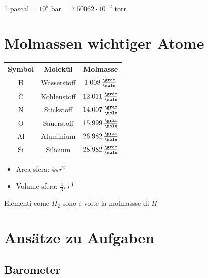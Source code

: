 1 pascal = $10^5$ bar = $7.50062 \cdot 10^{-2}$ torr

\section{Molmassen wichtiger Atome}
\begin{minipage}{0.5\columnwidth}
    \renewcommand{\arraystretch}{1.3}
    \begin{tabular}{c | c | c }
        \textbf{Symbol} & \textbf{Molekül}  & \textbf{Molmasse}                 \\
        \hline
        H               & Wasserstoff       & $1.008 \, \frac{\gram}{\mole}$    \\
        C               & Kohlenstoff       & $12.011 \, \frac{\gram}{\mole}$   \\
        N               & Stickstoff        & $14.007 \, \frac{\gram}{\mole}$   \\
        O               & Sauerstoff        & $15.999 \, \frac{\gram}{\mole}$   \\
        Al              & Aluminium         & $26.982 \, \frac{\gram}{\mole}$   \\
        Si              & Silicium          & $28.982 \, \frac{\gram}{\mole}$   \\
    \end{tabular}\smallbreak
\end{minipage}\hfill
\begin{minipage}[b]{0.49\columnwidth}
    \begin{itemize}
        \item Area sfera: $4\pi r^2$
        \item Volume sfera: $\frac{4}{3} \pi r^3$
    \end{itemize}
\end{minipage}

Elementi come $H_2$ sono e volte la molmassse di $H$
\renewcommand{\arraystretch}{1}

\section{Ansätze zu Aufgaben}

\subsection{Barometer}

